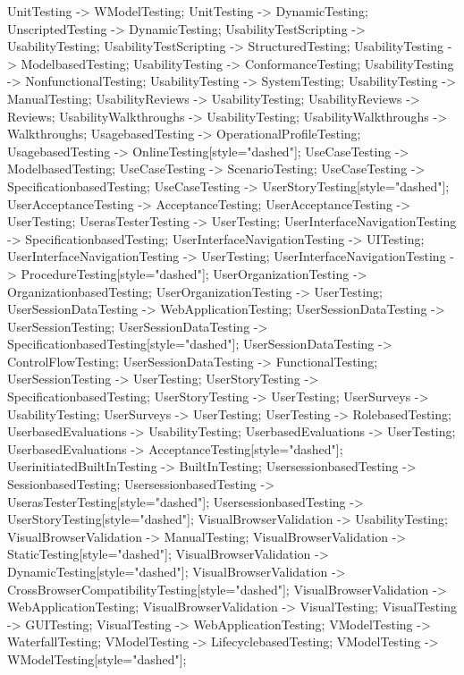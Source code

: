 \documentclass{article}
\begin{document}
{UnitTesting -> WModelTesting;
UnitTesting -> DynamicTesting;
UnscriptedTesting -> DynamicTesting;
UsabilityTestScripting -> UsabilityTesting;
UsabilityTestScripting -> StructuredTesting;
UsabilityTesting -> ModelbasedTesting;
UsabilityTesting -> ConformanceTesting;
UsabilityTesting -> NonfunctionalTesting;
UsabilityTesting -> SystemTesting;
UsabilityTesting -> ManualTesting;
UsabilityReviews -> UsabilityTesting;
UsabilityReviews -> Reviews;
UsabilityWalkthroughs -> UsabilityTesting;
UsabilityWalkthroughs -> Walkthroughs;
UsagebasedTesting -> OperationalProfileTesting;
UsagebasedTesting -> OnlineTesting[style="dashed"];
UseCaseTesting -> ModelbasedTesting;
UseCaseTesting -> ScenarioTesting;
UseCaseTesting -> SpecificationbasedTesting;
UseCaseTesting -> UserStoryTesting[style="dashed"];
UserAcceptanceTesting -> AcceptanceTesting;
UserAcceptanceTesting -> UserTesting;
UserasTesterTesting -> UserTesting;
UserInterfaceNavigationTesting -> SpecificationbasedTesting;
UserInterfaceNavigationTesting -> UITesting;
UserInterfaceNavigationTesting -> UserTesting;
UserInterfaceNavigationTesting -> ProcedureTesting[style="dashed"];
UserOrganizationTesting -> OrganizationbasedTesting;
UserOrganizationTesting -> UserTesting;
UserSessionDataTesting -> WebApplicationTesting;
UserSessionDataTesting -> UserSessionTesting;
UserSessionDataTesting -> SpecificationbasedTesting[style="dashed"];
UserSessionDataTesting -> ControlFlowTesting;
UserSessionDataTesting -> FunctionalTesting;
UserSessionTesting -> UserTesting;
UserStoryTesting -> SpecificationbasedTesting;
UserStoryTesting -> UserTesting;
UserSurveys -> UsabilityTesting;
UserSurveys -> UserTesting;
UserTesting -> RolebasedTesting;
UserbasedEvaluations -> UsabilityTesting;
UserbasedEvaluations -> UserTesting;
UserbasedEvaluations -> AcceptanceTesting[style="dashed"];
UserinitiatedBuiltInTesting -> BuiltInTesting;
UsersessionbasedTesting -> SessionbasedTesting;
UsersessionbasedTesting -> UserasTesterTesting[style="dashed"];
UsersessionbasedTesting -> UserStoryTesting[style="dashed"];
VisualBrowserValidation -> UsabilityTesting;
VisualBrowserValidation -> ManualTesting;
VisualBrowserValidation -> StaticTesting[style="dashed"];
VisualBrowserValidation -> DynamicTesting[style="dashed"];
VisualBrowserValidation -> CrossBrowserCompatibilityTesting[style="dashed"];
VisualBrowserValidation -> WebApplicationTesting;
VisualBrowserValidation -> VisualTesting;
VisualTesting -> GUITesting;
VisualTesting -> WebApplicationTesting;
VModelTesting -> WaterfallTesting;
VModelTesting -> LifecyclebasedTesting;
VModelTesting -> WModelTesting[style="dashed"];
}
\end{document}

